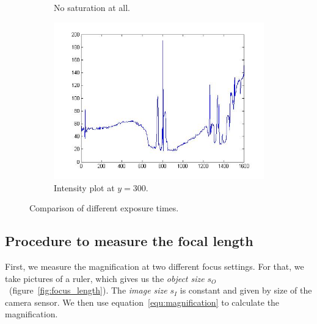 \documentclass[a4paper, 12pt]{paper}
\begin{document}
\begin{figure}[h]
\begin{subfigure}[p]{0.45\textwidth}
        \caption{No saturation at all.}
    \end{subfigure}
    \begin{subfigure}[p]{0.45\textwidth}
        \includegraphics[width=\textwidth]{img/no_sat_int}
        \caption{Intensity plot at $y=300$.}
    \end{subfigure}
    \caption{Comparison of different exposure times.}
\label{fig:saturation}
\end{figure}

\subsection{Procedure to measure the focal length}

First, we measure the magnification at two different focus settings.
For that, we take pictures of a ruler, which gives us the \emph{object size} $s_O$~(figure~\ref{fig:focus_length}).
The \emph{image size} $s_I$ is constant and given by size of the camera sensor.
We then use equation~\ref{equ:magnification} to calculate the magnification.
\end{document}
